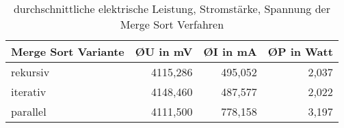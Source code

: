 \begin{table}[htbp]
  \centering
  \caption{durchschnittliche elektrische Leistung, Stromst\"arke, Spannung der Merge Sort Verfahren}
    \begin{tabular}{lrrr}
    \toprule
    Merge Sort Variante & \multicolumn{1}{l}{\O U in mV} & \multicolumn{1}{l}{\O I in mA} & \multicolumn{1}{l}{\O P in Watt} \\
    \midrule
    rekursiv & 4115,286 & 495,052 & 2,037 \\
    \midrule
    iterativ & 4148,460 & 487,577 & 2,022 \\
    \midrule
    parallel & 4111,500 & 778,158 & 3,197 \\
    \bottomrule
    \end{tabular}%
  \label{tab:MergeSortLeistung}%
\end{table}%
